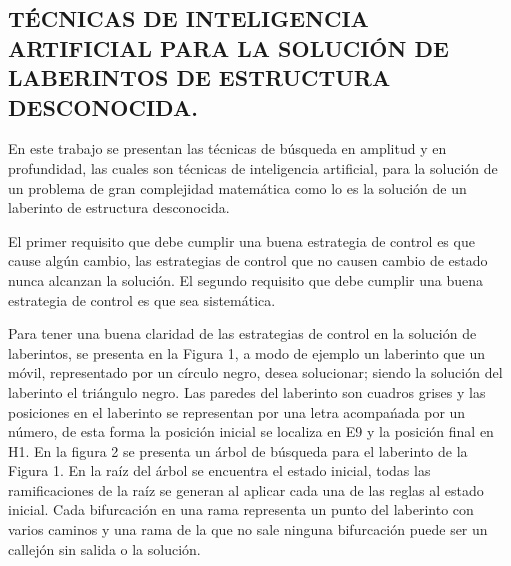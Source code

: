 \documentclass{article}%
\begin{document}
\subsection{T\'ECNICAS DE INTELIGENCIA ARTIFICIAL PARA LA SOLUCI\'ON DE LABERINTOS DE ESTRUCTURA DESCONOCIDA.}

En este trabajo se presentan las t\'ecnicas de b\'usqueda en amplitud y en profundidad, las cuales son t\'ecnicas de inteligencia artificial, para la soluci\'on de un problema de gran complejidad matem\'atica como lo es la soluci\'on de un laberinto de estructura desconocida.

El primer requisito que debe cumplir una buena estrategia de control es que cause alg\'un cambio, las estrategias de control que no causen cambio de estado nunca alcanzan la soluci\'on. El segundo requisito que debe cumplir una buena estrategia de control es que sea sistem\'atica.

Para tener una buena claridad de las estrategias de control en la soluci\'on de laberintos, se presenta en la Figura 1, a modo de ejemplo un laberinto que un m\'ovil, representado por un c\'irculo negro, desea solucionar; siendo la soluci\'on del laberinto el tri\'angulo negro. Las paredes del laberinto son cuadros grises y las posiciones en el laberinto se representan por una letra acompa\'nada por un n\'umero, de esta forma la posici\'on inicial se localiza en E9 y la posici\'on final en H1. En la figura 2 se presenta un \'arbol de b\'usqueda para el laberinto de la Figura 1. En la ra\'iz del \'arbol se encuentra el estado inicial, todas las ramificaciones de la ra\'iz se generan al aplicar cada una de las reglas al estado inicial. Cada bifurcaci\'on en una rama representa un punto del laberinto con varios caminos y una rama de la que no sale ninguna bifurcaci\'on puede ser un callej\'on sin salida o la soluci\'on. 
\end{document}
